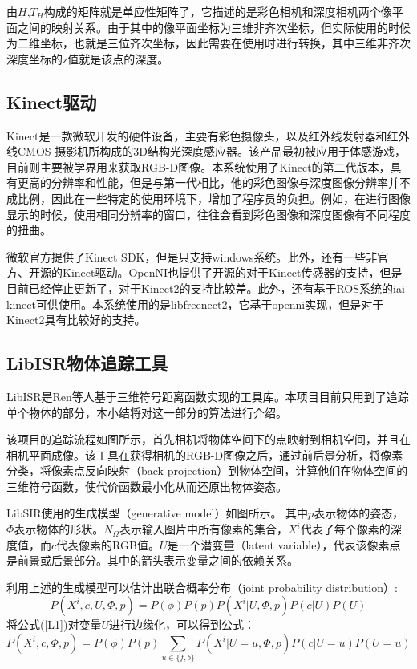 由$H$,$T_H$构成的矩阵就是单应性矩阵了，它描述的是彩色相机和深度相机两个像平面之间的映射关系。由于其中的像平面坐标为三维非齐次坐标，但实际使用的时候为二维坐标，也就是三位齐次坐标，因此需要在使用时进行转换，其中三维非齐次深度坐标的z值就是该点的深度。

\subsection{Kinect驱动}
Kinect是一款微软开发的硬件设备，主要有彩色摄像头，以及红外线发射器和红外线CMOS 摄影机所构成的3D结构光深度感应器。该产品最初被应用于体感游戏，目前则主要被学界用来获取RGB-D图像。本系统使用了Kinect的第二代版本，具有更高的分辨率和性能，但是与第一代相比，他的彩色图像与深度图像分辨率并不成比例，因此在一些特定的使用环境下，增加了程序员的负担。例如，在进行图像显示的时候，使用相同分辨率的窗口，往往会看到彩色图像和深度图像有不同程度的扭曲。

微软官方提供了Kinect SDK，但是只支持windows系统。此外，还有一些非官方、开源的Kinect驱动。OpenNI\cite{Openni}也提供了开源的对于Kinect传感器的支持，但是目前已经停止更新了，对于Kinect2的支持比较差。此外，还有基于ROS系统的iai kinect\cite{iai_kinect2}可供使用。本系统使用的是libfreenect2\cite{libfreenect2}，它基于openni实现，但是对于Kinect2具有比较好的支持。

\subsection{LibISR物体追踪工具}
LibISR是Ren等人基于三维符号距离函数实现的工具库\cite{Ren_3DV_2014, star3d_iccv_2013}。本项目目前只用到了追踪单个物体的部分，本小结将对这一部分的算法进行介绍\cite{ren2017real}。

该项目的追踪流程如图所示，首先相机将物体空间下的点映射到相机空间，并且在相机平面成像。该工具在获得相机的RGB-D图像之后，通过前后景分析，将像素分类，将像素点反向映射（back-projection）到物体空间，计算他们在物体空间的三维符号函数，使代价函数最小化从而还原出物体姿态。

LibSIR使用的生成模型（generative model）如图所示。
其中$p$表示物体的姿态，$\Phi$表示物体的形状。$N_\Omega$表示输入图片中所有像素的集合，$X^i$代表了每个像素的深度值，而$c$代表像素的RGB值。$U$是一个潜变量（latent variable），代表该像素点是前景或后景部分。其中的箭头表示变量之间的依赖关系。

利用上述的生成模型可以估计出联合概率分布（joint probability distribution）:
\begin{equation}
 P(X^i, c, U, \Phi, p) = P(\phi)P(p)P(X^i|U, \Phi, p)P(c|U)P(U)\label{L1}
\end{equation}
将公式(\ref{L1})对变量$U$进行边缘化，可以得到公式：
\begin{equation}
 P(X^i, c, \Phi, p) = P(\phi)P(p)\sum_{u\in\{f,b\}}P(X^i|U=u, \Phi, p)P(c|U=u)P(U=u)\label{L2}
\end{equation}

